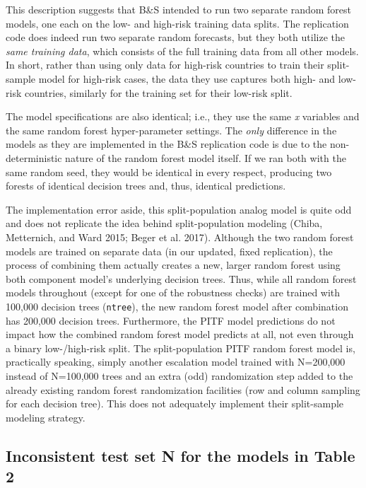 \documentclass[
]{article}
\begin{document}
This description suggests that B\&S intended to run two separate random forest models, one each on the low- and high-risk training data splits. The replication code does indeed run two separate random forecasts, but they both utilize the \emph{same training data}, which consists of the full training data from all other models. In short, rather than using only data for high-risk countries to train their split-sample model for high-risk cases, the data they use captures both high- and low-risk countries, similarly for the training set for their low-risk split.

The model specifications are also identical; i.e., they use the same \emph{x} variables and the same random forest hyper-parameter settings. The \emph{only} difference in the models as they are implemented in the B\&S replication code is due to the non-deterministic nature of the random forest model itself. If we ran both with the same random seed, they would be identical in every respect, producing two forests of identical decision trees and, thus, identical predictions.

The implementation error aside, this split-population analog model is quite odd and does not replicate the idea behind split-population modeling (Chiba, Metternich, and Ward 2015; Beger et al. 2017). Although the two random forest models are trained on separate data (in our updated, fixed replication), the process of combining them actually creates a new, larger random forest using both component model's underlying decision trees. Thus, while all random forest models throughout (except for one of the robustness checks) are trained with 100,000 decision trees (\texttt{ntree}), the new random forest model after combination has 200,000 decision trees. Furthermore, the PITF model predictions do not impact how the combined random forest model predicts at all, not even through a binary low-/high-risk split. The split-population PITF random forest model is, practically speaking, simply another escalation model trained with N=200,000 instead of N=100,000 trees and an extra (odd) randomization step added to the already existing random forest randomization facilities (row and column sampling for each decision tree). This does not adequately implement their split-sample modeling strategy.

\hypertarget{inconsistent-test-set-n-for-the-models-in-table-2}{%
\subsection{Inconsistent test set N for the models in Table 2}\label{inconsistent-test-set-n-for-the-models-in-table-2}}
\end{document}
